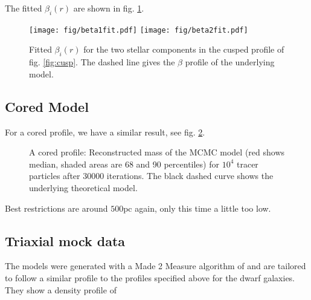 

The fitted $\beta_i(r)$ are shown in fig. \ref{fig:betai}.

\begin{figure}
\begin{center}
\hspace{-7mm}
\texttt{[image: fig/beta1fit.pdf]}
\texttt{[image: fig/beta2fit.pdf]}
\caption{Fitted $\beta_i(r)$ for the two stellar components in the
  cusped profile of fig. \ref{fig:cusp}. The dashed line gives the
  $\beta$ profile of the underlying model.}
\label{fig:betai}
\end{center}
\end{figure}



\subsection{Cored Model}
For a cored profile, we have a similar result, see fig. \ref{fig:core}. 

\begin{figure}
\begin{center}
\hspace{-7mm}
\caption{A cored profile: Reconstructed mass of the MCMC model (red
  shows median, shaded areas are 68 and 90 percentiles) for $10^4$
  tracer particles after 30000 iterations. The black dashed curve
  shows the underlying theoretical model.}
\label{fig:core}
\end{center}
\end{figure}

Best restrictions are around $500$pc again, only this time a little
too low.





\subsection{Triaxial mock data}

The models were generated with a Made 2 Measure algorithm of \cite{Dehnen2009} and are tailored to follow a similar profile to the profiles specified above for the dwarf galaxies. They show a density profile of

